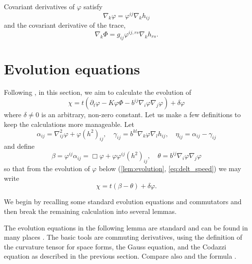 \documentclass{amsart}
\begin{document}
Covariant derivatives of \(\varphi\) satisfy
\begin{equation}
\label{eq:delphi}
\nabla_k \varphi = \varphi^{ij} \nabla_k h_{ij}
\end{equation}
and the covariant derivative of the trace,
\begin{equation}
\label{eq:delPhi}
\nabla_k \Phi = g_{ij} \varphi^{ij,rs} \nabla_k h_{rs}.
\end{equation}

\section{Evolution equations}

Following \cite{MR1316556, MR1100812, MR1296393, MR1480081}, in this section, we aim to calculate the evolution of
\[
\chi =t(\partial_t \varphi - K \varphi \Phi - b^{ij} \nabla_i \varphi \nabla_j \varphi) +\delta\varphi
\]
where \(\delta \ne 0\) is an arbitrary, non-zero constant. Let us make a few definitions to keep the calculations more manageable. Let
\[
\alpha_{ij} = \nabla^2_{ij} \varphi + \varphi(h^2)_{ij}, \quad \gamma_{ij} = b^{kl} \nabla_k \varphi \nabla_l h_{ij}, \quad \eta_{ij} = \alpha_{ij} - \gamma_{ij}
\]
and define
\[
\beta = \varphi^{ij} \alpha_{ij} = \Box\varphi + \varphi \varphi^{ij}(h^2)_{ij}, \quad \theta =  b^{ij} \nabla_i \varphi \nabla_j \varphi
\]
so that from the evolution of \(\varphi\) below (\cref{lem:evolution}, \cref{eq:delt_speed}) we may write
\[
\chi = t(\beta - \theta) + \delta\varphi.
\]

We begin by recalling some standard evolution equations and commutators and then break the remaining calculation into several lemmas.

The evolution equations in the following lemma are standard and can be found in many places \cite{MR892052, MR1316556, MR1100812, MR1296393, MR1480081}. The basic tools are commuting derivatives, using the definition of the curvature tensor for space forms, the Gauss equation, and the Codazzi equation as described in the previous section. Compare also \cite[p.~94-95]{Gerhardt:/2006} and the formula \cite[eq.~(6.17)]{Gerhardt:01/1996}.
\end{document}
